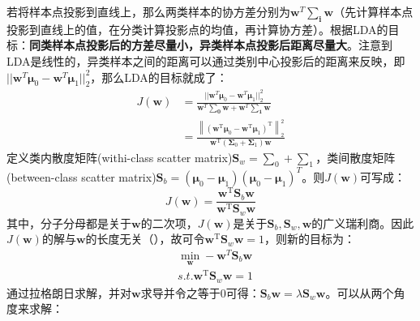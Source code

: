 若将样本点投影到直线上，那么两类样本的协方差分别为$\boldsymbol{w}^T \boldsymbol{\sum_i} \boldsymbol{w}$（先计算样本点投影到直线上的值，在分类计算投影点的均值，再计算协方差）。根据LDA的目标：\textbf{同类样本点投影后的方差尽量小，异类样本点投影后距离尽量大}。注意到LDA是线性的，异类样本之间的距离可以通过类别中心投影后的距离来反映，即$||\boldsymbol{w}^T\boldsymbol{\mu}_0 - \boldsymbol{w}^T\boldsymbol{\mu}_1||_2^2$，那么LDA的目标就成了：
\begin{align}
	J(\boldsymbol{w}) &= \frac{||\boldsymbol{w}^T\boldsymbol{\mu}_0 - \boldsymbol{w}^T\boldsymbol{\mu}_1||_2^2}{\boldsymbol{w}^T \boldsymbol{\sum_0} \boldsymbol{w} + \boldsymbol{w}^T \boldsymbol{\sum_1} \boldsymbol{w}} \nonumber \\
	&= \frac{\left\|\left(\boldsymbol{w}^{\mathrm{T}} \boldsymbol{\mu}_{0}-\boldsymbol{w}^{\mathrm{T}} \boldsymbol{\mu}_{1}\right)^{\mathrm{T}}\right\|_{2}^{2}}{\boldsymbol{w}^{\mathrm{T}}\left(\boldsymbol{\Sigma}_{0}+\boldsymbol{\Sigma}_{1}\right) \boldsymbol{w}} \nonumber
\end{align}
定义类内散度矩阵(withi-class scatter matrix)$\boldsymbol{S}_w = \boldsymbol{\sum}_0 + \boldsymbol{\sum}_1$，类间散度矩阵(between-class scatter matrix)$\boldsymbol{S}_b = (\boldsymbol{\mu}_0 - \boldsymbol{\mu}_1) (\boldsymbol{\mu}_0 - \boldsymbol{\mu}_1)^T$。则$J(\boldsymbol{w})$可写成：
$$
J(\boldsymbol{w}) = \frac{\boldsymbol{w}^{\mathrm{T}} \mathbf{S}_{b} \boldsymbol{w}}{\boldsymbol{w}^{\mathrm{T}} \mathbf{S}_{w} \boldsymbol{w}}
$$
其中，分子分母都是关于$\boldsymbol{w}$的二次项，$J(\boldsymbol{w})$是关于$\boldsymbol{S}_b, \boldsymbol{S}_w, \boldsymbol{w}$的广义瑞利商。因此$J(\boldsymbol{w})$的解与$\boldsymbol{w}$的长度无关（），故可令$\boldsymbol{w}^{\mathrm{T}} \mathbf{S}_{w} \boldsymbol{w} = 1$，则新的目标为：
\begin{align}
	& \mathop{min} \limits_{\boldsymbol{w}} -\boldsymbol{w}^T\boldsymbol{S}_b\boldsymbol{w} \nonumber\\
	& s.t. \boldsymbol{w}^{\mathrm{T}} \mathbf{S}_{w} \boldsymbol{w} = 1 \nonumber
\end{align}
通过拉格朗日求解，并对$\boldsymbol{w}$求导并令之等于0可得：$\mathbf{S}_{b} \boldsymbol{w}=\lambda \mathbf{S}_{w} \boldsymbol{w}$。可以从两个角度来求解：
